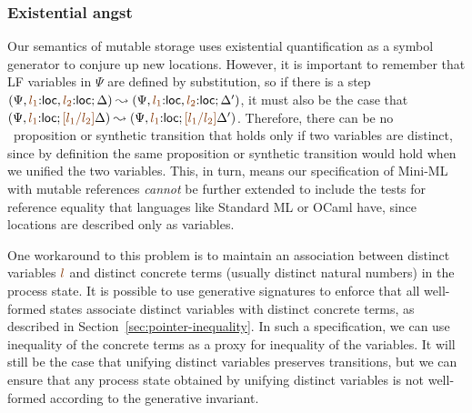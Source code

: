 \subsubsection{Existential angst} 

Our semantics of mutable storage uses existential quantification 
as a symbol generator to conjure up new locations. However, it is important
to remember that LF variables in $\Psi$ are defined by substitution,
so if there is a step 
$(\Psi, \lf{l_1}{:}{\sf loc}, \lf{l_2}{:}{\sf loc}; \Delta)
  \leadsto 
 (\Psi, \lf{l_1}{:}{\sf loc}, \lf{l_2}{:}{\sf loc}; \Delta')$,
it must also be the case that 
$(\Psi, \lf{l_1}{:}{\sf loc}; \lf{[l_1/l_2]}\Delta)
  \leadsto 
 (\Psi, \lf{l_1}{:}{\sf loc}; \lf{[l_1/l_2]}\Delta')$. 
%
Therefore, 
%
there can be no \sls~proposition or synthetic transition that 
holds only if two variables are distinct, since by definition the
same proposition or synthetic transition would hold when we unified
the two variables.
%
This, in turn, means our specification of Mini-ML with mutable
references {\it cannot} be further extended to include the tests for
reference equality that languages like Standard ML or OCaml have, since
locations are described only as variables. 

One workaround to this problem is to maintain an association between 
distinct variables $\lf{l}$ and distinct concrete terms (usually
distinct natural numbers) in the process state. It is possible
to use generative signatures to enforce that all well-formed
states associate distinct variables with distinct concrete terms, as 
described in Section~\ref{sec:pointer-inequality}. In such 
a specification, we can use inequality of the concrete terms as 
a proxy for inequality of the variables. It will still
be the case that unifying distinct variables preserves transitions,
but we can ensure that any process state obtained by unifying
distinct variables is not well-formed according to the generative
invariant.






